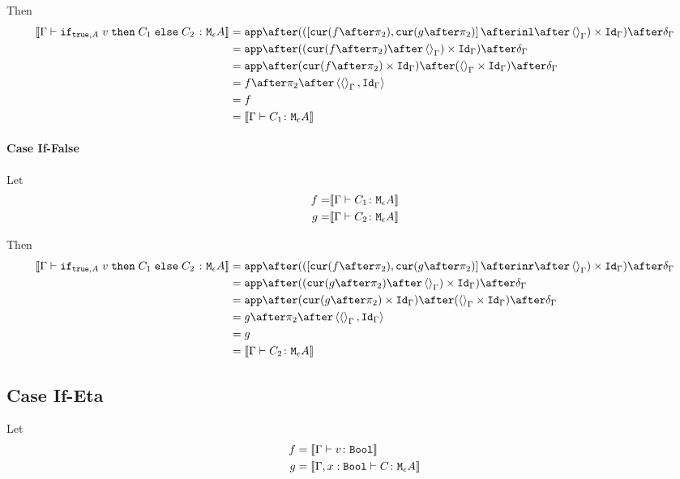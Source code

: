 {Then
\begin{equation}
    \begin{split}
        \deno{\gtyperelation{\ifthenelse{\t}{A}{v}{C_1}{C_2}}{\mea}} & = \ifMorph{\inl\after\term{\G}}{f}{g} \\
        & = \app\after((\cur{f\after\pp}\after\term{\G})\times\idg)\after\diag{\G}\\
        & = \app\after(\cur{f\after\pp}\times\idg)\after(\term{\G}\times\idg)\after\diag{\G}\\
        & = f\after\pp\after\pr{\term{\G}}{\idg}\\
        & = f \\
        & = \deno{\gtyperelation{C_1}{\mea}}\\
    \end{split}
\end{equation}


\paragraph{Case If-False}
Let
\begin{align}
    f = &{\bf [\![}\Gamma \vdash C_1 \colon \texttt{M}_{\epsilon}{A}{\bf ]\!]}\\
    g = &{\bf [\![}\Gamma \vdash C_2 \colon \texttt{M}_{\epsilon}{A}{\bf ]\!]}\\
\end{align}

Then
\begin{equation}
    \begin{split}
        \deno{\gtyperelation{\ifthenelse{\t}{A}{v}{C_1}{C_2}}{\mea}} & = \ifMorph{\inr\after\term{\G}}{f}{g} \\
        & = \app\after((\cur{g\after\pp}\after\term{\G})\times\idg)\after\diag{\G}\\
        & = \app\after(\cur{g\after\pp}\times\idg)\after(\term{\G}\times\idg)\after\diag{\G}\\
        & = g\after\pp\after\pr{\term{\G}}{\idg}\\
        & = g \\
        & = \deno{\gtyperelation{C_2}{\mea}}\\
    \end{split}
\end{equation}

\subsection{Case If-Eta}
    Let 
    \begin{align}
        f & = {\bf [\![}\Gamma \vdash v \colon \texttt{Bool}{\bf ]\!]} \\
        g & = {\bf [\![}\Gamma, x: \texttt{Bool} \vdash C \colon \texttt{M}_{\epsilon}{A}{\bf ]\!]} \\
    \end{align}


}
